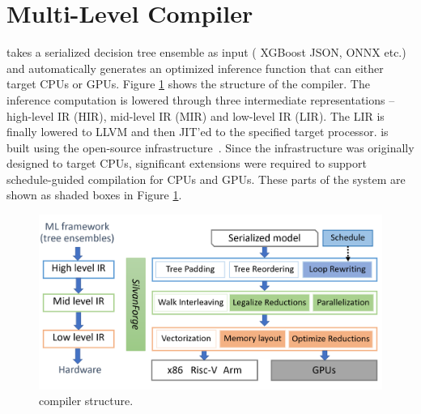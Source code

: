 \section{\Treebeard{} Multi-Level Compiler}


\Treebeard{} takes a serialized decision tree ensemble as input (
XGBoost JSON, ONNX etc.) and automatically generates an optimized inference function
that can either target CPUs or GPUs. 
Figure \ref{Fig:CompilerStructure} shows the structure of the \Treebeard{} compiler. 
The inference computation is lowered through three intermediate representations
-- high-level IR (HIR), mid-level IR (MIR) and low-level IR (LIR). The LIR is
finally lowered to LLVM and then JIT'ed to the specified target processor. 
\Treebeard{} is built using the open-source \TreebeardOLD{} infrastructure~\cite{Treebeard}.
Since the \TreebeardOLD{} infrastructure was originally designed to target CPUs,
significant extensions were required to support schedule-guided compilation for CPUs and GPUs. 
These parts of the system are shown as shaded boxes in Figure \ref{Fig:CompilerStructure}.

\begin{figure}[htb]
  \centering
  \includegraphics[width=\linewidth]{figures/compiler.png}
  \caption{\Treebeard{} compiler structure.}
  \label{Fig:CompilerStructure}
\end{figure}

